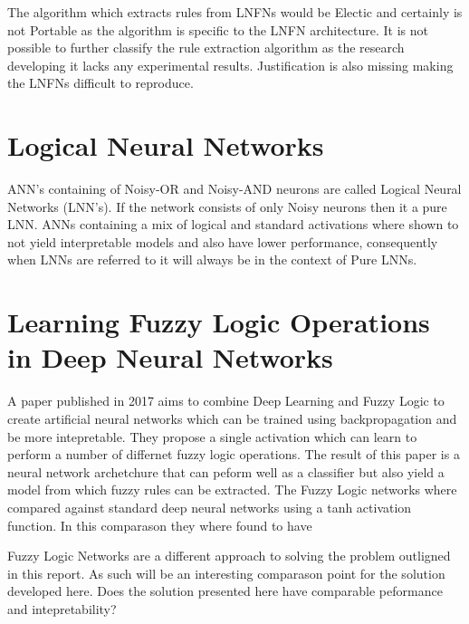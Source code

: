 The algorithm which extracts rules from LNFNs would be Electic and certainly is not Portable as the algorithm is specific to the LNFN architecture. It is not possible to further classify the rule extraction algorithm as the research developing it lacks any experimental results. Justification is also missing making the LNFNs difficult to reproduce.

\section{Logical Neural Networks}
ANN's containing of Noisy-OR and Noisy-AND neurons are called Logical Neural Networks \cite{LearningLogicalActivations} (LNN's). If the network consists of only Noisy neurons then it a pure LNN. ANNs containing a mix of logical and standard activations where shown to not yield interpretable models and also have lower performance, consequently when LNNs are referred to it will always be in the context of Pure LNNs.


\section{Learning Fuzzy Logic Operations in Deep Neural Networks}
A paper published in 2017 \cite{godfrey2017parameterized} aims to combine Deep Learning and Fuzzy Logic to create artificial neural networks which can be trained using backpropagation and be more intepretable.  They propose a single activation which can learn to perform a number of differnet fuzzy logic operations. The result of this paper is a neural network archetchure that can peform well as a classifier but also yield a model from which fuzzy rules can be extracted. The Fuzzy Logic networks where compared against standard deep neural networks using a tanh activation function. In this comparason they where found to have 

Fuzzy Logic Networks are a different approach to solving the problem outligned in this report. As such will be an interesting comparason point for the solution developed here. Does the solution presented here have comparable peformance and intepretability? 

